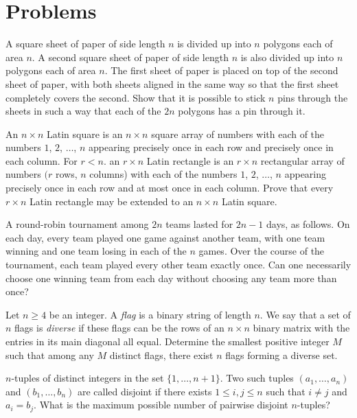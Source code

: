 \documentclass[11pt]{article}
\begin{document}
\section{Problems}

\begin{problem}
	A square sheet of paper of side length $n$ is divided up into $n$ polygons each of area $n$. A second square sheet of paper of side length $n$ is also divided up into $n$ polygons each of area $n$. The first sheet of paper is placed on top of the second sheet of paper, with both sheets aligned in the same way so that the first sheet completely covers the second. Show that it is possible to stick $n$ pins through the sheets in such a way that each of the $2 n$ polygons has a pin through it.
\end{problem}

\begin{problem}
	An $n \times n$ Latin square is an $n \times n$ square array of numbers with each of the numbers $1$, $2$, $\ldots$, $n$ appearing precisely once in each row and precisely once in each column. For $r<n$. an $r \times n$ Latin rectangle is an $r \times n$ rectangular array of numbers $(r$ rows, $n$ columns) with each of the numbers $1$, $2$, $\ldots$, $n$ appearing precisely once in each row and at most once in each column. Prove that every $r \times n$ Latin rectangle may be extended to an $n \times n$ Latin
	square.
\end{problem}

\begin{problem}
	A round-robin tournament among $2 n$ teams lasted for $2 n-1$ days, as follows. On each day, every team played one game against another team, with one team winning and one team losing in each of the $n$ games. Over the course of the tournament, each team played every other team exactly once. Can one necessarily choose one winning team from each day without choosing any team more than once?
\end{problem}

\begin{problem}
	Let $n \geq 4$ be an integer. A \emph{flag} is a binary string of length $n$. We say that a set of $n$ flags is \emph{diverse} if these flags can be the rows of an $n \times n$ binary matrix with the entries in its main diagonal all equal. Determine the smallest positive integer $M$ such that among any $M$ distinct flags, there exist $n$ flags forming a diverse set.
\end{problem}

\begin{problem}
	$n$-tuples of distinct integers in the set $\{1, \ldots, n+1\}$. Two such tuples $\left(a_{1}, \ldots, a_{n}\right)$ and $\left(b_{1}, \ldots, b_{n}\right)$ are called disjoint if there exists $1 \leq i, j \leq n$ such that $i \neq j$ and $a_{i}=b_{j}$. What is the maximum possible number of pairwise disjoint $n$-tuples?
\end{problem}
\end{document}
